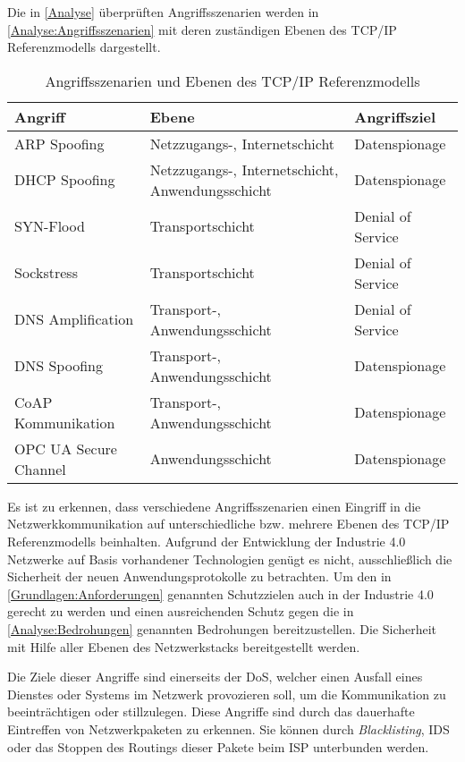 Die in \autoref{Analyse} überprüften Angriffsszenarien werden in \autoref{Analyse:Angriffsszenarien} mit deren zuständigen Ebenen des \ac{TCP}/\ac{IP} Referenzmodells dargestellt. 

\begin{table}[h]
    \caption{Angriffsszenarien und Ebenen des TCP/IP Referenzmodells}
    \label{Analyse:Angriffsszenarien}
    \renewcommand{\arraystretch}{1.2}
    \centering
    \sffamily
    \begin{footnotesize}
      \begin{tabular}{l l l}
      \toprule
      \textbf{Angriff} & \textbf{Ebene} & \textbf{Angriffsziel}\\
      \midrule
      ARP Spoofing & Netzzugangs-, Internetschicht & Datenspionage\\
      DHCP Spoofing & Netzzugangs-, Internetschicht, Anwendungsschicht & Datenspionage\\
      SYN-Flood & Transportschicht & Denial of Service\\
      Sockstress & Transportschicht & Denial of Service\\
      DNS Amplification & Transport-, Anwendungsschicht & Denial of Service\\
      DNS Spoofing & Transport-, Anwendungsschicht & Datenspionage\\
      CoAP Kommunikation & Transport-, Anwendungsschicht & Datenspionage\\
      OPC UA Secure Channel & Anwendungsschicht & Datenspionage\\
      \bottomrule
      \end{tabular}
    \end{footnotesize}
    \rmfamily
\end{table}

Es ist zu erkennen, dass verschiedene Angriffsszenarien einen Eingriff in die Netzwerkkommunikation auf unterschiedliche bzw. mehrere Ebenen des \ac{TCP}/\ac{IP} Referenzmodells beinhalten. Aufgrund der Entwicklung der Industrie 4.0 Netzwerke auf Basis vorhandener Technologien genügt es nicht, ausschließlich die Sicherheit der neuen Anwendungsprotokolle zu betrachten. Um den in \autoref{Grundlagen:Anforderungen} genannten Schutzzielen auch in der Industrie 4.0 gerecht zu werden und einen ausreichenden Schutz gegen die in \autoref{Analyse:Bedrohungen} genannten Bedrohungen bereitzustellen. Die Sicherheit mit Hilfe aller Ebenen des Netzwerkstacks bereitgestellt werden.

Die Ziele dieser Angriffe sind einerseits der \ac{DoS}, welcher einen Ausfall eines Dienstes oder Systems im Netzwerk provozieren soll, um die Kommunikation zu beeinträchtigen oder stillzulegen. Diese Angriffe sind durch das dauerhafte Eintreffen von Netzwerkpaketen zu erkennen. Sie können durch \textit{Blacklisting}, \ac{IDS} oder das Stoppen des Routings dieser Pakete beim \ac{ISP} unterbunden werden. 

